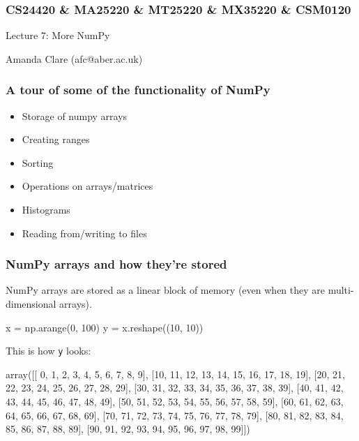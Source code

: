 \documentclass{beamer}
\begin{document}
\begin{frame}
\frametitle{CS24420 \& MA25220 \& MT25220 \& MX35220 \& CSM0120}

\begin{center}
\begin{huge}
Lecture 7: More NumPy
\end{huge}
\bigskip

Amanda Clare (afc@aber.ac.uk)

\end{center}
\end{frame}


\begin{frame}[fragile]
\frametitle{A tour of some of the functionality of NumPy}
\begin{itemize}
\item Storage of numpy arrays
\item Creating ranges
\item Sorting
\item Operations on arrays/matrices
\item Histograms
\item Reading from/writing to files
\end{itemize}
\end{frame}



\begin{frame}[fragile]
\frametitle{NumPy arrays and how they're stored}
NumPy arrays are stored as a linear block of memory (even when they
are multi-dimensional arrays).
\begin{code}
x = np.arange(0, 100)
y = x.reshape((10, 10))
\end{code}
This is how \texttt{y} looks:
\begin{code}
array([[ 0,  1,  2,  3,  4,  5,  6,  7,  8,  9],
       [10, 11, 12, 13, 14, 15, 16, 17, 18, 19],
       [20, 21, 22, 23, 24, 25, 26, 27, 28, 29],
       [30, 31, 32, 33, 34, 35, 36, 37, 38, 39],
       [40, 41, 42, 43, 44, 45, 46, 47, 48, 49],
       [50, 51, 52, 53, 54, 55, 56, 57, 58, 59],
       [60, 61, 62, 63, 64, 65, 66, 67, 68, 69],
       [70, 71, 72, 73, 74, 75, 76, 77, 78, 79],
       [80, 81, 82, 83, 84, 85, 86, 87, 88, 89],
       [90, 91, 92, 93, 94, 95, 96, 97, 98, 99]])
\end{code}
\end{frame}
\end{document}
